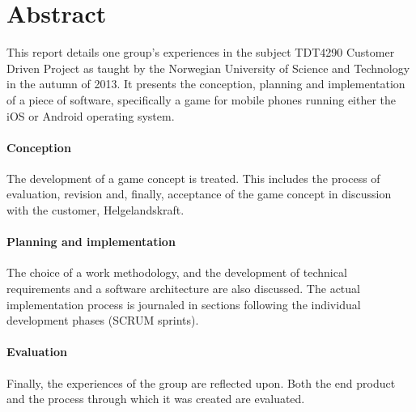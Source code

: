 \section*{Abstract}

This report details one group's experiences in the subject TDT4290 Customer
Driven Project as taught by the Norwegian University of Science and Technology
in the autumn of 2013. It presents the conception, planning and implementation
of a piece of software, specifically a game for mobile phones running either
the iOS or Android operating system.

\paragraph{Conception}
The development of a game concept is treated. This includes the process of
evaluation, revision and, finally, acceptance of the game concept in discussion
with the customer, Helgelandskraft.

\paragraph{Planning and implementation}
The choice of a work methodology, and the development of technical requirements
and a software architecture are also discussed. The actual implementation
process is journaled in sections following the individual development phases
(SCRUM sprints).

\paragraph{Evaluation}
Finally, the experiences of the group are reflected upon. Both the end product
and the process through which it was created are evaluated.
